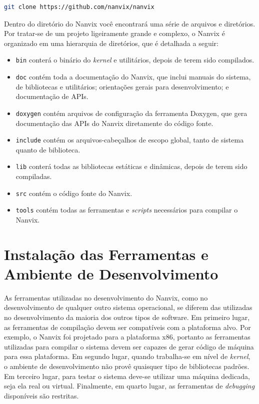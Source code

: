 \documentclass[11pt]{article}
\begin{document}
\begin{lstlisting}[language=bash,numbers=none,frame=single]
git clone https://github.com/nanvix/nanvix
\end{lstlisting}

Dentro do diretório do Nanvix você encontrará uma série de arquivos e diretórios. Por tratar-se de um projeto ligeiramente grande e complexo, o Nanvix é organizado em uma hierarquia de diretórios, que é detalhada a seguir:

\begin{itemize}
    \item \texttt{bin} conterá o binário do \textit{kernel} e utilitários, depois de terem sido compilados.
    \item \texttt{doc} contém toda a documentação do Nanvix, que inclui manuais do sistema, de bibliotecas e utilitários; orientações gerais para desenvolvimento; e documentação de APIs.
    \item \texttt{doxygen} contém arquivos de configuração da ferramenta Doxygen, que gera documentação das APIs do Nanvix diretamente do código fonte.
    \item \texttt{include} contém os arquivos-cabeçalhos de escopo global, tanto de sistema quanto de biblioteca.
    \item \texttt{lib} conterá todas as bibliotecas estáticas e dinâmicas, depois de terem sido compiladas.
    \item \texttt{src} contém o código fonte do Nanvix.
    \item \texttt{tools} contém todas as ferramentas e \textit{scripts} necessários para compilar o Nanvix.
\end{itemize}

\section{Instalação das Ferramentas e Ambiente de Desenvolvimento}
\label{sec:ferramentas}

As ferramentas utilizadas no desenvolvimento do Nanvix, como no desenvolvimento de qualquer outro sistema operacional, se diferem das utilizadas no desenvolvimento da maioria dos outros tipos de software. Em primeiro lugar, as ferramentas de compilação devem ser compatíveis com a plataforma alvo. Por exemplo, o Nanvix foi projetado para a plataforma x86, portanto as ferramentas utilizadas para compilar o sistema devem ser capazes de gerar código de máquina para essa plataforma. Em segundo lugar, quando trabalha-se em nível de \textit{kernel}, o ambiente de desenvolvimento não provê quaisquer tipo de bibliotecas padrões. Em terceiro lugar, para testar o sistema deve-se utilizar uma máquina dedicada, seja ela real ou virtual. Finalmente, em quarto lugar, as ferramentas de \textit{debugging} disponíveis são restritas.
\end{document}
